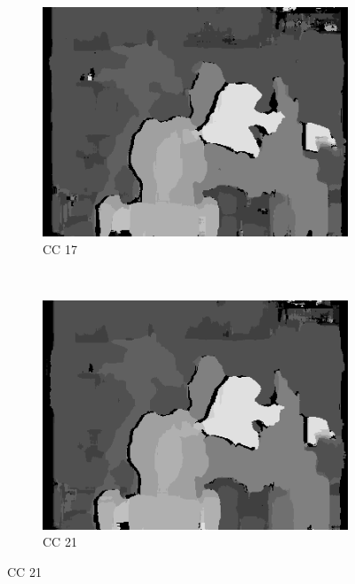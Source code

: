 \begin{figure}
\begin{subfigure}[b]{0.23\textwidth}
    \includegraphics[width=\textwidth]{images/stereo-pairs/tsukuba_dual_crosschecked_17.png}
    \caption{CC 17}
  \end{subfigure}
  ~
  \begin{subfigure}[b]{0.23\textwidth}
    \centering
    \includegraphics[width=\textwidth]{images/stereo-pairs/tsukuba_dual_crosschecked_21.png}
    \caption{CC 21}
  \end{subfigure}



\end{figure}
